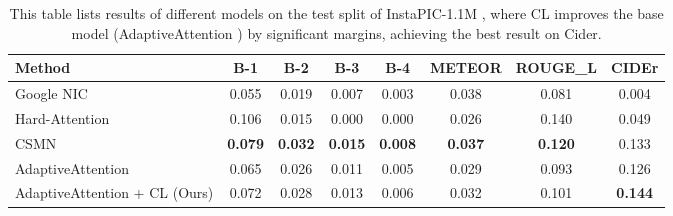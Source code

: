\begin{table}
\small
\centering
\begin{tabular}{lccccccc}
\toprule
Method & B-1 & B-2 & B-3 & B-4 & METEOR & ROUGE\_L & CIDEr \\
\midrule
Google NIC \cite{vinyals2015show} & 0.055 & 0.019 & 0.007 & 0.003 & 0.038 & 0.081 & 0.004 \\
Hard-Attention \cite{xu2015show} & 0.106 & 0.015 & 0.000 & 0.000 & 0.026 & 0.140 & 0.049 \\
CSMN \cite{park2017attend} & \textbf{0.079} & \textbf{0.032} & \textbf{0.015} & \textbf{0.008} & \textbf{0.037} & \textbf{0.120} & 0.133 \\
AdaptiveAttention \cite{lu2016knowing} & 0.065 & 0.026 & 0.011 & 0.005 & 0.029 & 0.093 & 0.126 \\
AdaptiveAttention + CL (Ours) & 0.072 & 0.028 & 0.013 & 0.006 & 0.032 & 0.101 & \textbf{0.144} \\
\bottomrule
\end{tabular}
\vspace{1mm}
\caption{\small This table lists results of different models on the test split of InstaPIC-1.1M \cite{park2017attend},
where CL improves the base model (AdaptiveAttention \cite{lu2016knowing}) by significant margins,
achieving the best result on Cider.}
\vspace{-2mm}
\end{table}
